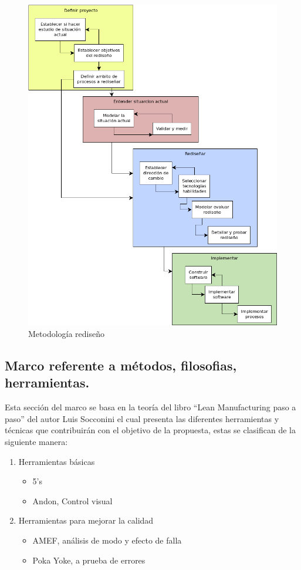 \documentclass[
]{article}
\providecommand{\tightlist}{%
  \setlength{\itemsep}{0pt}\setlength{\parskip}{0pt}}
\begin{document}
\begin{figure}[H]

{\centering \includegraphics[width=0.8\linewidth]{marco teorico/diagramas/metologia_rediseno} 

}

\caption{Metodología rediseño}\label{fig:unnamed-chunk-1}
\end{figure}

\hypertarget{marco-referente-a-muxe9todos-filosofias-herramientas.}{%
\subsection{Marco referente a métodos, filosofias,
herramientas.}\label{marco-referente-a-muxe9todos-filosofias-herramientas.}}

Esta sección del marco se basa en la teoría del libro ``Lean
Manufacturing paso a paso'' del autor Luis Socconini el cual presenta
las diferentes herramientas y técnicas que contribuirán con el objetivo
de la propuesta, estas se clasifican de la siguiente manera:

\begin{enumerate}
\def\labelenumi{\arabic{enumi}.}
\tightlist
\item
  Herramientas básicas

  \begin{itemize}
  \tightlist
  \item
    5's
  \item
    Andon, Control visual
  \end{itemize}
\item
  Herramientas para mejorar la calidad

  \begin{itemize}
  \tightlist
  \item
    AMEF, análisis de modo y efecto de falla
  \item
    Poka Yoke, a prueba de errores
  \end{itemize}
\end{enumerate}
\end{document}
